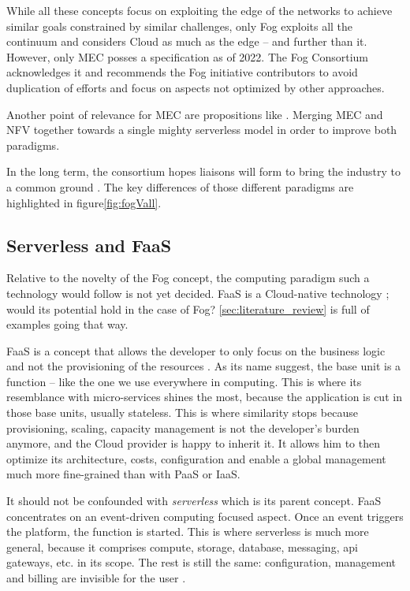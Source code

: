 \documentclass[11pt]{sdm}
\begin{document}
While all these concepts focus on exploiting the edge of the networks to achieve similar goals constrained by similar challenges, only Fog exploits all the continuum and considers Cloud as much as the edge -- and further than it. However, only \gls{MEC} posses a specification as of 2022. The Fog Consortium acknowledges it and recommends the Fog initiative contributors to avoid duplication of efforts and focus on aspects not optimized by other approaches. 

Another point of relevance for \gls{MEC} are propositions like . Merging \gls{MEC} and \gls{NFV} together towards a single mighty serverless model in order to improve both paradigms.

In the long term, the consortium hopes liaisons will form to bring the industry to a common ground \cite{ieee_standards_association_ieee_2018}. The key differences of those different paradigms are highlighted in figure\ref{fig:fogVall}.

\hypersetup{linkcolor=}
\subsection{Serverless and \acrfull{FaaS}}

Relative to the novelty of the Fog concept, the computing paradigm such a technology would follow is not yet decided. \gls{FaaS} is a Cloud-native technology ; would its potential hold in the case of Fog? \ref{sec:literature_review} is full of examples going that way.

\gls{FaaS} is a concept that allows the developer to only focus on the business logic and not the provisioning of the resources \cite{redhat_what_2020}. As its name suggest, the base unit is a function -- like the one we use everywhere in computing. This is where its resemblance with micro-services shines the most, because the application is cut in those base units, usually stateless. This is where similarity stops because provisioning, scaling, capacity management is not the developer's burden anymore, and the Cloud provider is happy to inherit it. It allows him to then optimize its architecture, costs, configuration and enable a global management much more fine-grained than with \gls{PaaS} or \gls{IaaS}.

It should not be confounded with \emph{serverless} which is its parent concept. \gls{FaaS} concentrates on an event-driven computing focused aspect. Once an event triggers the platform, the function is started. This is where serverless is much more general, because it comprises compute, storage, database, messaging, api gateways, etc. in its scope. The rest is still the same: configuration, management and billing are invisible for the user \cite{ibm_faas_2019}.
\end{document}
